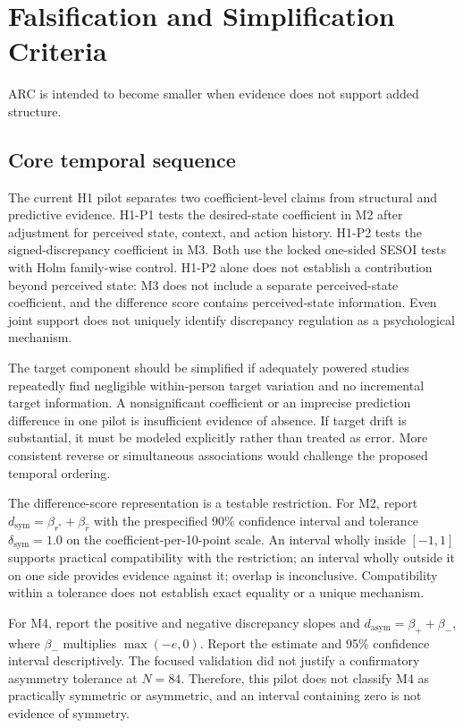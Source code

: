\section{Falsification and Simplification Criteria}

ARC is intended to become smaller when evidence does not support added structure.

\subsection{Core temporal sequence}

The current H1 pilot separates two coefficient-level claims from structural and predictive evidence. H1-P1 tests the desired-state coefficient in M2 after adjustment for perceived state, context, and action history. H1-P2 tests the signed-discrepancy coefficient in M3. Both use the locked one-sided SESOI tests with Holm family-wise control. H1-P2 alone does not establish a contribution beyond perceived state: M3 does not include a separate perceived-state coefficient, and the difference score contains perceived-state information. Even joint support does not uniquely identify discrepancy regulation as a psychological mechanism.

The target component should be simplified if adequately powered studies repeatedly find negligible within-person target variation and no incremental target information. A nonsignificant coefficient or an imprecise prediction difference in one pilot is insufficient evidence of absence. If target drift is substantial, it must be modeled explicitly rather than treated as error. More consistent reverse or simultaneous associations would challenge the proposed temporal ordering.

The difference-score representation is a testable restriction. For M2, report \(d_{\mathrm{sym}}=\beta_{r^\ast}+\beta_{\hat r}\) with the prespecified 90\% confidence interval and tolerance \(\delta_{\mathrm{sym}}=1.0\) on the coefficient-per-10-point scale. An interval wholly inside \([-1,1]\) supports practical compatibility with the restriction; an interval wholly outside it on one side provides evidence against it; overlap is inconclusive. Compatibility within a tolerance does not establish exact equality or a unique mechanism.

For M4, report the positive and negative discrepancy slopes and \(d_{\mathrm{asym}}=\beta_{+}+\beta_{-}\), where \(\beta_{-}\) multiplies \(\max(-e,0)\). Report the estimate and 95\% confidence interval descriptively. The focused validation did not justify a confirmatory asymmetry tolerance at \(N=84\). Therefore, this pilot does not classify M4 as practically symmetric or asymmetric, and an interval containing zero is not evidence of symmetry.

